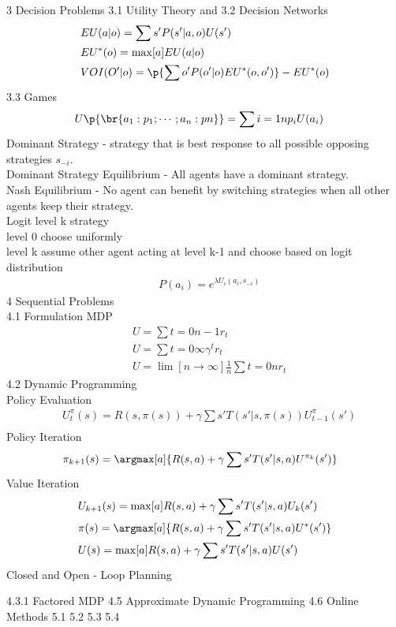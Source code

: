 \documentclass[10pt, oneside]{article}
\begin{document}
\begin{multicols}{2}
3 Decision Problems
3.1 Utility Theory and 3.2 Decision Networks
  \begin{align*}
    & EU(a|o) = \sum{s'}{}{P(s'| a, o)U(s')} \\
    & EU^*(o) = \max[a]{EU(a|o)} \\
    & VOI(O'|o) = \p{\sum{o'}{}{P(o' | o)EU^*(o,o')}} - EU^*(o)
  \end{align*}
3.3 Games
  \begin{align*}
    & U\p{\br{a_1 : p_1; \cdots; a_n : pn}} = \sum{i = 1}{n}{p_i U(a_i)}
  \end{align*}
  Dominant Strategy - strategy that is best response to all possible opposing
  strategies $s_{-i}$. \\
  Dominant Strategy Equilibrium - All agents have a dominant strategy. \\
  Nash Equilibrium - No agent can benefit by switching strategies when all other
  agents keep their strategy. \\
  Logit level k strategy \\
  level 0 choose uniformly  \\
  level k assume other agent acting at level k-1 and choose based on logit
  distribution \\
  \begin{align*}
    & P(a_i) = e^{\lambda U_i(a_i, s_{-i})}
  \end{align*}
4 Sequential Problems \\
4.1 Formulation MDP
  \begin{align*}
    & U = \sum{t = 0}{n-1}{r_t} \\
    & U = \sum{t = 0}{\infty}{ \gamma^t r_t} \\
    & U = \lim[n \to \infty]{\frac{1}{n}\sum{t = 0}{n}{r_t}}
  \end{align*}
4.2 Dynamic Programming \\
  Policy Evaluation
  \begin{align*}
    & U_t^{\pi}(s) = R(s, \pi(s)) + \gamma \sum{s'}{}{T(s'|s, \pi(s))U_{t-1}^{\pi}(s')} \\
  \end{align*}
  Policy Iteration
  \begin{align*}
    &\pi_{k+1}(s) = \argmax[a]{R(s,a) + \gamma \sum{s'}{}{T(s'|s, a)U^{\pi_k}(s')}}
  \end{align*}
  Value Iteration
  \begin{align*}
    & U_{k+1}(s) = \max[a]{R(s, a) + \gamma \sum{s'}{}{T(s'|s, a)U_k(s')}} \\
    & \pi(s) = \argmax[a]{R(s, a) + \gamma \sum{s'}{}{T(s'|s, a)U^*(s')}} \\
    & U(s) = \max[a]{R(s, a) + \gamma \sum{s'}{}{T(s'|s, a)U(s')}}
  \end{align*}
  Closed and Open - Loop Planning

4.3.1 Factored MDP
4.5 Approximate Dynamic Programming
4.6 Online Methods
5.1
5.2
5.3
5.4
\end{multicols}
\end{document}
